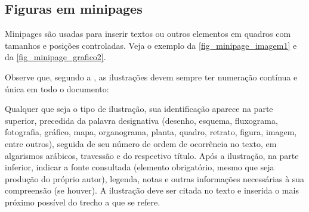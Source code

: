 
\subsection{Figuras em minipages}

Minipages são usadas para inserir textos ou outros elementos em quadros
com tamanhos e posições controladas. Veja o exemplo da
\autoref{fig_minipage_imagem1} e da \autoref{fig_minipage_grafico2}.




Observe que, segundo a , as
ilustrações devem sempre ter numeração contínua e única em todo o documento:

\begin{citacao}
Qualquer que seja o tipo de ilustração, sua identificação aparece na parte
superior, precedida da palavra designativa (desenho, esquema, fluxograma,
fotografia, gráfico, mapa, organograma, planta, quadro, retrato, figura,
imagem, entre outros), seguida de seu número de ordem de ocorrência no texto,
em algarismos arábicos, travessão e do respectivo título. Após a ilustração, na
parte inferior, indicar a fonte consultada (elemento obrigatório, mesmo que
seja produção do próprio autor), legenda, notas e outras informações
necessárias à sua compreensão (se houver). A ilustração deve ser citada no
texto e inserida o mais próximo possível do trecho a que se
refere. \cite[seções 5.8]{NBR14724:2011}
\end{citacao}

